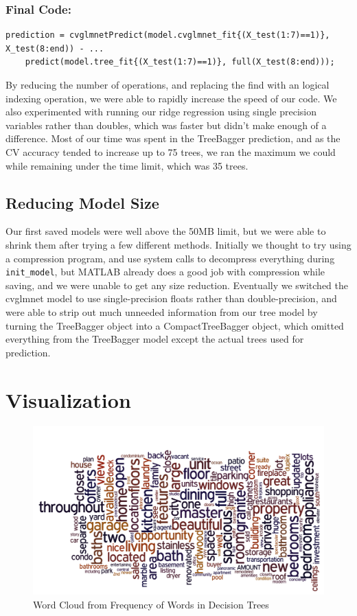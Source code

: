 \documentclass[11pt]{article}
\begin{document}
\subsubsection*{Final Code:}
\begin{lstlisting}
prediction = cvglmnetPredict(model.cvglmnet_fit{(X_test(1:7)==1)}, X_test(8:end)) - ...
	predict(model.tree_fit{(X_test(1:7)==1)}, full(X_test(8:end)));
\end{lstlisting}

By reducing the number of operations, and replacing the find with an logical indexing operation, we were able to rapidly increase the speed of our code. We also experimented with running our ridge regression using single precision variables rather than doubles, which was faster but didn't make enough of a difference. Most of our time was spent in the TreeBagger prediction, and as the CV accuracy tended to increase up to 75 trees, we ran the maximum we could while remaining under the time limit, which was 35 trees.

\subsection{Reducing Model Size}
Our first saved models were well above the 50MB limit, but we were able to shrink them after trying a few different methods. Initially we thought to try using a compression program, and use system calls to decompress everything during \texttt{init\_model}, but MATLAB already does a good job with compression while saving, and we were unable to get any size reduction. Eventually we switched the cvglmnet model to use single-precision floats rather than double-precision, and were able to strip out much unneeded information from our tree model by turning the TreeBagger object into a CompactTreeBagger object, which omitted everything from the TreeBagger model except the actual trees used for prediction. 

\section{Visualization}

\begin{figure}
	\centering
	\caption{Word Cloud from Frequency of Words in Decision Trees}
	\includegraphics[scale=0.55]{word_cloud.png}
\end{figure}
\end{document}
